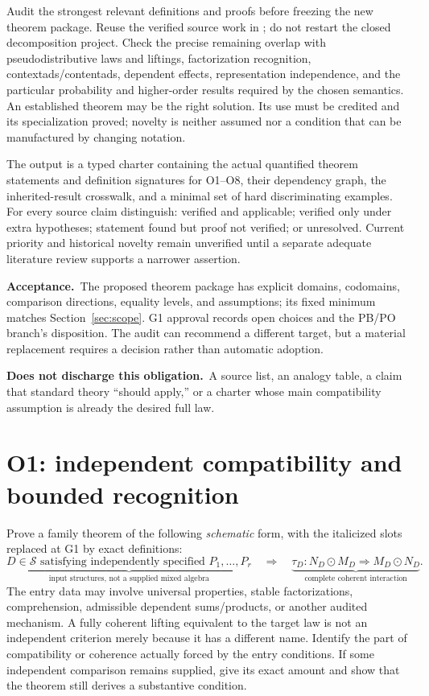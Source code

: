 \documentclass[11pt,a4paper]{article}
\newcommand{\accept}{\par\textbf{Acceptance.}\ }
\newcommand{\notaccepted}{\par\textbf{Does not discharge this obligation.}\ }
\begin{document}
Audit the strongest relevant definitions and proofs before freezing the new
theorem package. Reuse the verified source work in \cite{Audit,Unified}; do
not restart the closed decomposition project. Check the precise remaining
overlap with pseudodistributive laws and liftings, factorization recognition,
contextads/contentads, dependent effects, representation independence, and
the particular probability and higher-order results required by the chosen
semantics. An established theorem may be the right solution. Its use must be
credited and its specialization proved; novelty is neither assumed nor a
condition that can be manufactured by changing notation.

The output is a typed charter containing the actual quantified theorem
statements and definition signatures for O1--O8, their dependency graph,
the inherited-result crosswalk, and a minimal set of hard discriminating
examples. For every source claim distinguish: verified and applicable;
verified only under extra hypotheses; statement found but proof not verified;
or unresolved. Current priority and historical novelty remain unverified
until a separate adequate literature review supports a narrower assertion.

\accept The proposed theorem package has explicit domains, codomains,
comparison directions, equality levels, and assumptions; its fixed minimum
matches Section~\ref{sec:scope}. G1 approval records open choices and the
PB/PO branch's disposition. The audit can recommend a different target, but
a material replacement requires a decision rather than automatic adoption.

\notaccepted A source list, an analogy table, a claim that standard theory
``should apply,'' or a charter whose main compatibility assumption is already
the desired full law.

\section{O1: independent compatibility and bounded recognition}\label{sec:o1}

Prove a family theorem of the following \emph{schematic} form, with the
italicized slots replaced at G1 by exact definitions:
\[
 \underbrace{D\in\mathcal S\text{ satisfying independently specified }
 P_1,\ldots,P_r}_{\text{input structures, not a supplied mixed algebra}}
 \quad\Longrightarrow\quad
 \underbrace{\tau_D:N_D\odot M_D\Rightarrow M_D\odot N_D}_{
 \text{complete coherent interaction}}.
\]
The entry data may involve universal properties, stable factorizations,
comprehension, admissible dependent sums/products, or another audited
mechanism. A fully coherent lifting equivalent to the target law is not an
independent criterion merely because it has a different name. Identify the
part of compatibility or coherence actually forced by the entry conditions.
If some independent comparison remains supplied, give its exact amount and
show that the theorem still derives a substantive condition.
\end{document}
